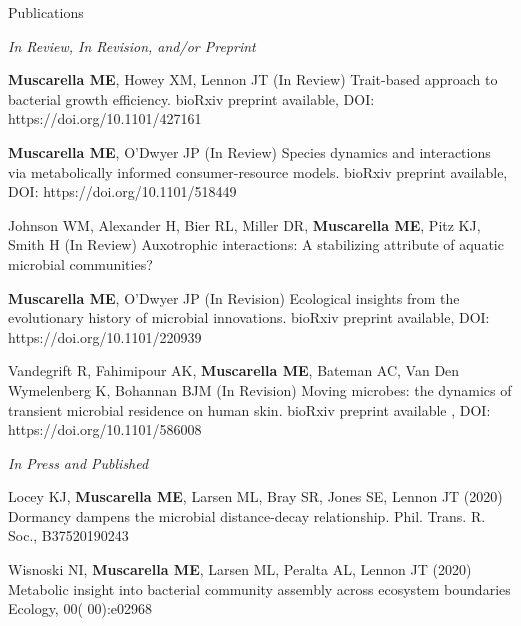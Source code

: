 \documentclass{resume} %
\begin{document}
\pagebreak



\begin{rSection}{Publications}

\emph{In Review, In Revision, and/or Preprint}

{\bf Muscarella ME}, Howey XM, Lennon JT (In Review) 
Trait-based approach to bacterial growth efficiency. 
bioRxiv preprint available, DOI: https://doi.org/10.1101/427161

{\bf Muscarella ME}, O'Dwyer JP (In Review) 
Species dynamics and interactions via metabolically informed consumer-resource models. 
bioRxiv preprint available, DOI: https://doi.org/10.1101/518449 

Johnson WM, Alexander H, Bier RL, Miller DR, {\bf Muscarella ME}, Pitz KJ, Smith H (In Review)
Auxotrophic interactions: A stabilizing attribute of aquatic microbial communities?

{\bf Muscarella ME}, O'Dwyer JP (In Revision) 
Ecological insights from the evolutionary history of microbial innovations. 
bioRxiv preprint available, DOI: https://doi.org/10.1101/220939 

Vandegrift R, Fahimipour AK, {\bf Muscarella ME}, Bateman AC, Van Den Wymelenberg K, 
Bohannan BJM (In Revision)
Moving microbes: the dynamics of transient microbial residence on human skin.
bioRxiv preprint available , DOI: https://doi.org/10.1101/586008 

\emph{In Press and Published}

Locey KJ, {\bf Muscarella ME}, Larsen ML, Bray SR, Jones SE, Lennon JT (2020)
Dormancy dampens the microbial distance-decay relationship.
Phil. Trans. R. Soc., B37520190243

Wisnoski NI, {\bf Muscarella ME}, Larsen ML, Peralta AL, Lennon JT (2020)
Metabolic insight into bacterial community assembly across ecosystem boundaries
Ecology, 00( 00):e02968


\end{rSection}
\end{document}
